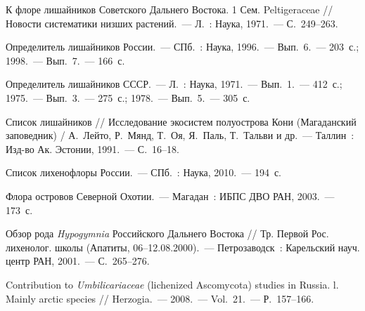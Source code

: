 \begin{thebibliography}{99}
\bibitem{} К флоре лишайников Советского Дальнего Востока. 1 Сем. Peltigeraceae // Новости систематики низших растений.~--- Л.~: Наука, 1971.~--- С.~249--263.

\bibitem{}Определитель лишайников России.~--- СПб.~: Наука, 1996.~--- Вып.~6.~--- 203~с.; 1998.~--- Вып.~7.~--- 166~с.

\bibitem{}Определитель лишайников СССР.~--- Л.~: Наука, 1971.~--- Вып.~1.~--- 412~с.; 1975.~--- Вып.~3.~--- 275~с.; 1978.~--- Вып.~5.~--- 305~с.

\bibitem{} Список лишайников // Исследование экосистем полуострова Кони (Магаданский заповедник) / А.~Лейто, Р.~Мянд, Т.~Оя, Я.~Паль, Т.~Тальви и др.~--- Таллин~: Изд-во Ак. Эстонии, 1991.~--- С.~16--18.

\bibitem{} Список лихенофлоры России.~--- СПб.~: Наука, 2010.~--- 194~с.

\bibitem{} Флора островов Северной Охотии.~--- Магадан~: ИБПС ДВО РАН, 2003.~--- 173~с.

\bibitem{} Обзор рода \textit{Hypogymnia} Российского Дальнего Востока // Тр. Первой Рос. лихенолог. школы (Апатиты, 06--12.08.2000).~--- Петрозаводск~: Карельский науч. центр РАН, 2001.~--- С.~265--276.

\bibitem{} Contribution to \textit{Umbilicariaceae} (lichenized Ascomycota) studies in Russia. l. Mainly arctic species // Herzogia.~--- 2008.~--- Vol.~21.~--- Р.~157--166.

\end{thebibliography}
